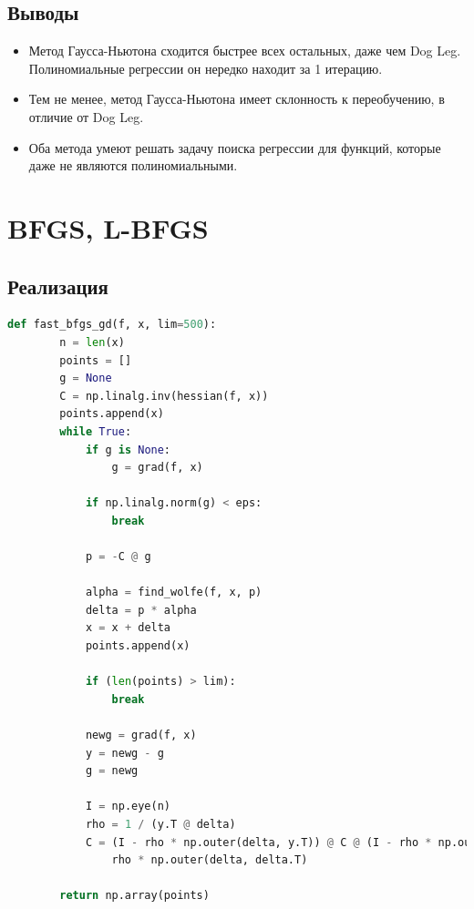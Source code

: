 \documentclass[a4paper,14pt,oneside,openany]{memoir}
\begin{document}
\subsection{Выводы}

\begin{itemize}
\item Метод Гаусса-Ньютона сходится быстрее всех остальных, даже чем Dog Leg. Полиномиальные регрессии он нередко находит за 1 итерацию.
\item Тем не менее, метод Гаусса-Ньютона имеет склонность к переобучению, в отличие от Dog Leg.
\item Оба метода умеют решать задачу поиска регрессии для функций, которые даже не являются полиномиальными.
\end{itemize}

\newpage

\section{BFGS, L-BFGS}
\subsection{Реализация}



\begin{lstlisting}[language=Python, caption=Реализация BFGS]
	def fast_bfgs_gd(f, x, lim=500):
	    n = len(x)
	    points = []
	    g = None
	    C = np.linalg.inv(hessian(f, x))
	    points.append(x)
	    while True:
	        if g is None:
	            g = grad(f, x)
	
	        if np.linalg.norm(g) < eps:
	            break
	
	        p = -C @ g
	
	        alpha = find_wolfe(f, x, p)
	        delta = p * alpha
	        x = x + delta
	        points.append(x)
	
	        if (len(points) > lim):
	            break
	
	        newg = grad(f, x)
	        y = newg - g
	        g = newg
	
	        I = np.eye(n)
	        rho = 1 / (y.T @ delta)
	        C = (I - rho * np.outer(delta, y.T)) @ C @ (I - rho * np.outer(y, delta.T)) + \
	            rho * np.outer(delta, delta.T)
	
	    return np.array(points)
\end{lstlisting}
\end{document}
